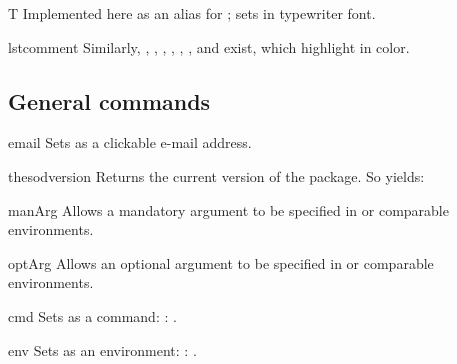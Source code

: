 \documentclass{sopra-base}
\begin{document}
\begin{command}{T}{}
    Implemented here as an alias for ; sets  in typewriter font.
\end{command}


\begin{command}{lstcomment}{}
    Similarly, , , , , , ,  and  exist, which highlight  in color.
\end{command}


\subsection{General commands}

\begin{command}{email}{}
    Sets  as a clickable e-mail address.
\end{command}

\begin{command}{thesodversion}{}
    Returns the current version of the package. So  yields: \thesodversion\\
\end{command}

\begin{command}{manArg}{}
    Allows a mandatory argument to be specified in  or comparable environments. 
\end{command}

\begin{command}{optArg}{}
    Allows an optional argument to be specified in  or comparable environments.
\end{command}

\begin{command}{cmd}{}
    Sets  as a command: : .
\end{command}

\begin{command}{env}{}
    Sets  as an environment: : .
\end{command}
\end{document}
